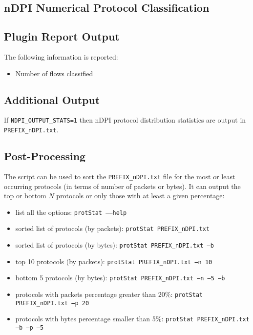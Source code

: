 \documentclass[documentation]{subfiles}
\begin{document}
\subsection{nDPI Numerical Protocol Classification}


\subsection{Plugin Report Output}
The following information is reported:
\begin{itemize}
    \item Number of flows classified
\end{itemize}

\subsection{Additional Output}
If {\tt NDPI\_OUTPUT\_STATS=1} then nDPI protocol distribution statistics are output in {\tt PREFIX\_nDPI.txt}.\\

\subsection{Post-Processing}
The {\tt{}} script can be used to sort the {\tt PREFIX\_nDPI.txt} file for the most or least occurring protocols (in terms of number of packets or bytes).
It can output the top or bottom $N$ protocols or only those with at least a given percentage:
\begin{itemize}
    \item list all the options: {\tt protStat --{}--help}
    \item sorted list of protocols (by packets): {\tt protStat PREFIX\_nDPI.txt}
    \item sorted list of protocols (by bytes): {\tt protStat PREFIX\_nDPI.txt --b}
    \item top 10 protocols (by packets): {\tt protStat PREFIX\_nDPI.txt --n 10}
    \item bottom 5 protocols (by bytes): {\tt protStat PREFIX\_nDPI.txt --n --5 --b}
    \item protocols with packets percentage greater than 20\%: {\tt protStat PREFIX\_nDPI.txt --p 20}
    \item protocols with bytes percentage smaller than 5\%: {\tt protStat PREFIX\_nDPI.txt --b --p --5}
\end{itemize}
\end{document}
